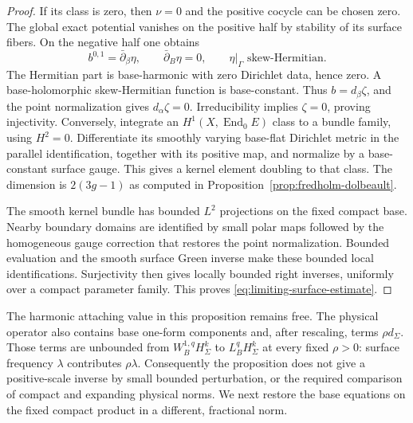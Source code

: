 \documentclass[11pt]{amsart}
\theoremstyle{definition}
\theoremstyle{remark}
\theoremstyle{plain}
\newcommand{\End}{\operatorname{End}}
\begin{document}
\begin{proof}
If its class is zero, then $\nu=0$ and the positive cocycle can
be chosen zero. The global exact potential vanishes on the positive
half by stability of its surface fibers. On the negative half one
obtains
\[
 b^{0,1}=\bar\partial_\beta\eta,\qquad
 \bar\partial_B\eta=0,\qquad
 \eta|_\Gamma\text{ skew-Hermitian}.
\]
The Hermitian part is base-harmonic with zero Dirichlet data, hence
zero. A base-holomorphic skew-Hermitian function is base-constant.
Thus $b=d_\beta\zeta$, and the point normalization gives
$d_\alpha\zeta=0$. Irreducibility implies $\zeta=0$, proving
injectivity. Conversely, integrate an $H^1(X,\End_0E)$ class to
a bundle family, using $H^2=0$. Differentiate its smoothly varying
base-flat Dirichlet metric in the parallel identification, together
with its positive map, and normalize by a base-constant surface
gauge. This gives a kernel element doubling to that class. The
dimension is $2(3g-1)$ as computed in
Proposition~\ref{prop:fredholm-dolbeault}.

The smooth kernel bundle has bounded $L^2$ projections on the fixed
compact base. Nearby boundary domains are identified by small polar
maps followed by the homogeneous gauge correction that restores
the point normalization. Bounded evaluation and the smooth surface
Green inverse make these bounded local identifications. Surjectivity
then gives locally bounded right inverses, uniformly over a compact
parameter family. This proves \eqref{eq:limiting-surface-estimate}.
\end{proof}

The harmonic attaching value in this proposition remains free.
The physical operator also contains base one-form components and,
after rescaling, terms $\rho d_\Sigma$. Those terms are unbounded
from $W^{1,q}_BH^k_\Sigma$ to $L^q_BH^k_\Sigma$ at every fixed
$\rho>0$: surface frequency $\lambda$ contributes $\rho\lambda$.
Consequently the proposition does not give a positive-scale inverse
by small bounded perturbation, or the required comparison of compact
and expanding physical norms. We next restore the base equations
on the fixed compact product in a different, fractional norm.
\end{document}
